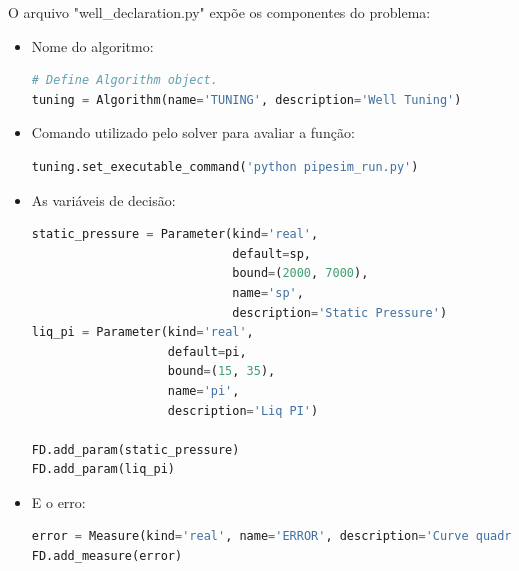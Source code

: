 O arquivo "well\_declaration.py" expõe os componentes do problema:

\begin{itemize}
\item Nome do algoritmo:
\begin{lstlisting}[language=Python]
# Define Algorithm object.
tuning = Algorithm(name='TUNING', description='Well Tuning')
\end{lstlisting}
\end{itemize}

\begin{itemize}
\item Comando utilizado pelo solver para avaliar a função:
\begin{lstlisting}[language=Python]
tuning.set_executable_command('python pipesim_run.py')
\end{lstlisting}
\end{itemize}


\begin{itemize}
\item As variáveis de decisão:
\begin{lstlisting}[language=Python]
static_pressure = Parameter(kind='real', 
                            default=sp, 
                            bound=(2000, 7000),
                            name='sp', 
                            description='Static Pressure')
liq_pi = Parameter(kind='real', 
                   default=pi, 
                   bound=(15, 35),
                   name='pi', 
                   description='Liq PI')

FD.add_param(static_pressure)
FD.add_param(liq_pi)
\end{lstlisting}
\end{itemize}

\begin{itemize}
\item E o erro:
\begin{lstlisting}[language=Python]
error = Measure(kind='real', name='ERROR', description='Curve quadratic error')
FD.add_measure(error)
\end{lstlisting}
\end{itemize}

